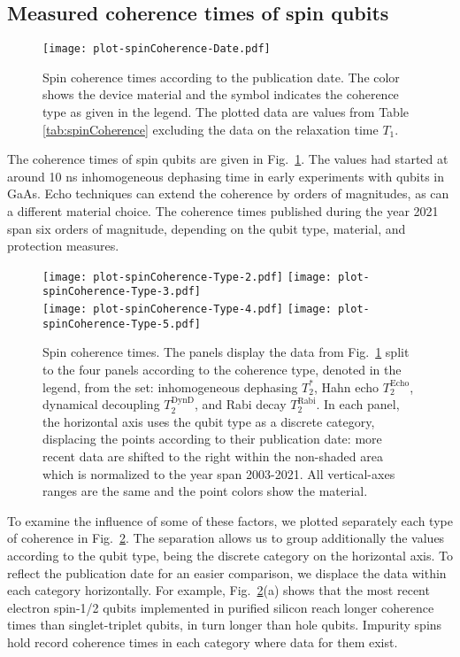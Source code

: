 \documentclass[aps, prx, showpacs, twocolumn, superscriptaddress, notitlepage, longbibliography, floatfix, nofootinbib]{revtex4-2}
\newcommand{\TRabi}{T_2^\mathrm{Rabi}}
\newcommand{\TEcho}{T_2^\mathrm{Echo}}
\newcommand{\TDynD}{T_2^\mathrm{DynD}}
\newcommand{\recheck}[1]{{#1}}
\begin{document}
\subsection{Measured coherence times of spin qubits}

\begin{figure}
  \texttt{[image: plot-spinCoherence-Date.pdf]}
  \caption{
  \label{fig:spinPhaseCoherenceAll}
  Spin coherence times according to the publication date. The color shows the device material and the symbol indicates the coherence type as given in the legend. The plotted data are values from Table \ref{tab:spinCoherence} excluding the data on the relaxation time $T_1$. 
  }
\end{figure}

The coherence times of spin qubits are given in Fig.~\ref{fig:spinPhaseCoherenceAll}. The values had started at around 10 ns inhomogeneous dephasing time in early experiments with qubits in GaAs. Echo techniques can extend the coherence by orders of magnitudes, as can a different material choice. \recheck{The coherence times published during the year 2021 span six orders of magnitude, depending on the qubit type, material, and protection measures.}

\begin{figure}
  \texttt{[image: plot-spinCoherence-Type-2.pdf]}
  \texttt{[image: plot-spinCoherence-Type-3.pdf]}\hfill \\
  \texttt{[image: plot-spinCoherence-Type-4.pdf]} \hfill
  \texttt{[image: plot-spinCoherence-Type-5.pdf]}
  \caption{
  \label{fig:spinPhaseCoherenceSubplots}
  Spin coherence times. The panels display the data from Fig.~\ref{fig:spinPhaseCoherenceAll} split to the four panels according to the coherence type, denoted in the legend, from the set: inhomogeneous dephasing $T_2^*$, Hahn echo $\TEcho$, dynamical decoupling $\TDynD$, and Rabi decay $\TRabi$. In each panel, the horizontal axis uses the qubit type as a discrete category, displacing the points according to their publication date: more recent data are shifted to the right within the non-shaded area which is \recheck{normalized to the year span 2003-2021}. All vertical-axes ranges are the same and the point colors show the material.
  }
\end{figure}



To examine the influence of some of these factors, we plotted separately each type of coherence in Fig.~\ref{fig:spinPhaseCoherenceSubplots}. The separation allows us to group additionally the values according to the qubit type, being the discrete category on the horizontal axis. To reflect the publication date for an easier comparison, we displace the data within each category horizontally. \recheck{For example, Fig.~\ref{fig:spinPhaseCoherenceSubplots}(a) shows that the most recent electron spin-1/2 qubits implemented in purified silicon reach longer coherence times than singlet-triplet qubits, in turn longer than hole qubits}. \recheck{Impurity spins hold record coherence times in each category where data for them exist.} 
\end{document}
